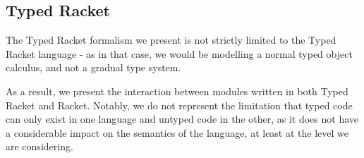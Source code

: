 \documentclass[a4paper,USenglish]{tex/lipics-v2016}
\begin{document}
\begin{mathpar}






\end{mathpar}

\subsection{Typed Racket}

The Typed Racket formalism we present is not strictly limited to the Typed Racket language - as in that case, we would be modelling a normal typed object calculus, and not a gradual type system.

As a result, we present the interaction between modules written in both Typed Racket and Racket. Notably, we do not represent the limitation that typed code can only exist in one language and untyped code in the other, as it does not have a considerable impact on the semantics of the language, at least at the level we are considering.
\end{document}
